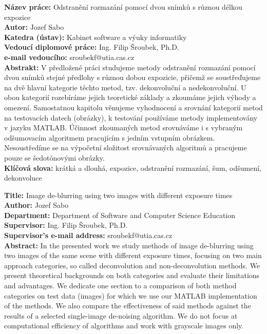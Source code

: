 \documentclass[12pt,notitlepage]{report}
\begin{document}
\tableofcontents %
\listoffigures
\listoftables

\newpage %

\noindent
\textbf{Název práce:} Odstranění rozmazání pomocí dvou snímků s různou délkou expozice\\
\textbf{Autor:} Jozef Sabo\\
\textbf{Katedra (ústav):} Kabinet software a výuky informatiky\\
\textbf{Vedoucí diplomové práce:} Ing. Filip Šroubek, Ph.D.\\
\textbf{e-mail vedoucího:} sroubekf@utia.cas.cz\\

\noindent \textbf{Abstrakt:} V předložené práci studujeme metody odstranění rozmazání pomocí dvou snímků stejné předlohy s různou dobou expozicie, přičemž se soustřeďujeme na dvě hlavní kategorie těchto metod, tzv. dekonvoluční a nedekonvoluční. U obou kategorií rozebíráme jejich teoretické základy a zkoumáme jejich výhody a omezení. Samostatnou kapitolu věnujeme vyhodnocení a srovnání kategorií metod na testovacích datech (obrázky), k testování používáme metody implementovány v jazyku MATLAB. Účinnost zkoumaných metod srovnáváme i s vybraným odšumovacím algoritmem pracujícím s jedním vstupním obrázkem. Nesoustředíme se na výpočetní složitost srovnávaných algoritmů a pracujeme pouze se šedotónovými obrázky.\\

\noindent \textbf{Klíčová slova:} krátká a dlouhá, expozice, odstranění rozmazání, šum,  odšumení, dekonvoluce

\clearpage

\noindent
\textbf{Title:} Image de-blurring using two images with different exposure times\\
\textbf{Author:} Jozef Sabo\\
\textbf{Department:} Department of Software and Computer Science Education\\
\textbf{Supervisor:} Ing. Filip Šroubek, Ph.D.\\
\textbf{Supervisor's e-mail address:} sroubekf@utia.cas.cz\\

\noindent \textbf{Abstract:} In the presented work we study methods of image de-blurring using two images of the same scene with different exposure times, focusing on two main approach categories, so called deconvolution and non-deconvolution methods. We present theoretical backgrounds on both categories and evaluate their limitations and advantages. We dedicate one section to a comparison of both method categories on test data (images) for which we use our MATLAB implementation of the methods. We also compare the effectiveness of said methods against the results of a selected single-image de-noising algorithm. We do not focus at computational efficiency of algorithms and work with grayscale images only.\\
\end{document}
